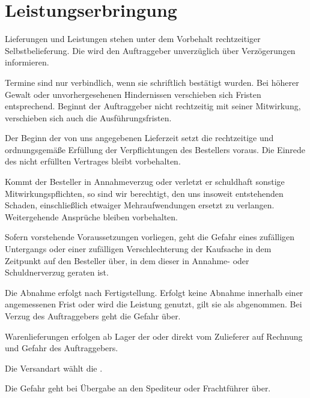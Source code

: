 \documentclass[fontsize=12pt,parskip=half]{scrartcl}
\begin{document}
\section{Leistungserbringung}

\begin{contract}

\Clause[title={Termine und Fristen}]

Lieferungen und Leistungen stehen unter dem Vorbehalt rechtzeitiger Selbstbelieferung. Die \companyName{} wird den Auftraggeber unverzüglich über Verzögerungen informieren. 

Termine sind nur verbindlich, wenn sie schriftlich bestätigt wurden. Bei höherer Gewalt oder unvorhergesehenen Hindernissen verschieben sich Fristen entsprechend. Beginnt der Auftraggeber nicht rechtzeitig mit seiner Mitwirkung, verschieben sich auch die Ausführungsfristen.

Der Beginn der von uns angegebenen Lieferzeit setzt die rechtzeitige und ordnungsgemäße Erfüllung der Verpflichtungen des Bestellers voraus. Die Einrede des nicht erfüllten Vertrages bleibt vorbehalten.

Kommt der Besteller in Annahmeverzug oder verletzt er schuldhaft sonstige Mitwirkungspflichten, so sind wir berechtigt, den uns insoweit entstehenden Schaden, einschließlich etwaiger Mehraufwendungen ersetzt zu verlangen. Weitergehende Ansprüche bleiben vorbehalten. 

Sofern vorstehende Voraussetzungen vorliegen, geht die Gefahr eines zufälligen Untergangs oder einer zufälligen Verschlechterung der Kaufsache in dem Zeitpunkt auf den Besteller über, in dem dieser in Annahme- oder Schuldnerverzug geraten ist.

\Clause[title={Abnahme und Gefahrübergang bei Werkleistungen}]

Die Abnahme erfolgt nach Fertigstellung. Erfolgt keine Abnahme innerhalb einer angemessenen Frist oder wird die Leistung genutzt, gilt sie als abgenommen. Bei Verzug des Auftraggebers geht die Gefahr über.

\Clause[title={Lieferung und Gefahrübergang bei Waren}]

Warenlieferungen erfolgen ab Lager der \companyName{} oder direkt vom Zulieferer auf Rechnung und Gefahr des Auftraggebers. 

Die Versandart wählt die \companyName{}. 

Die Gefahr geht bei Übergabe an den Spediteur oder Frachtführer über.

\Clause[title={Eigentumsvorbehalt}]


\end{contract}
\end{document}
